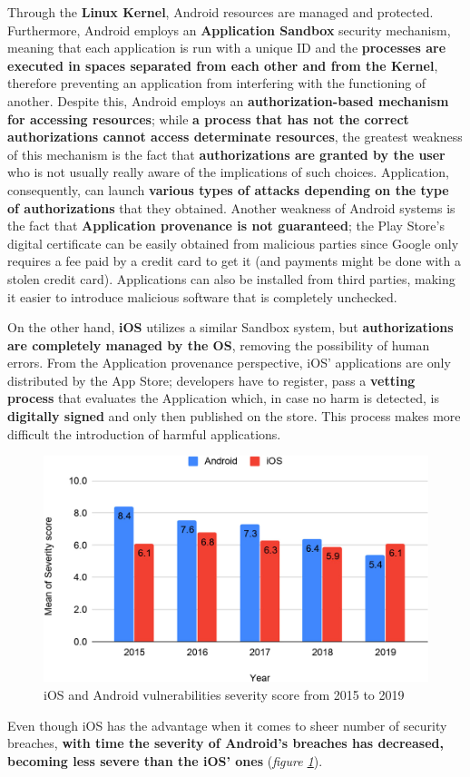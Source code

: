 Through the \textbf{Linux Kernel}, Android resources are managed and protected. Furthermore, Android employs an \textbf{Application Sandbox} security mechanism, meaning that each application is run with a unique ID and the \textbf{processes are executed in spaces separated from each other and from the Kernel}, therefore preventing an application from interfering with the functioning of another. Despite this, Android employs an \textbf{authorization-based mechanism for accessing resources}; while \textbf{a process that has not the correct authorizations cannot access determinate resources}, the greatest weakness of this mechanism is the fact that \textbf{authorizations are granted by the user} who is not usually really aware of the implications of such choices. Application, consequently, can launch \textbf{various types of attacks depending on the type of authorizations} that they obtained. Another weakness of Android systems is the fact that \textbf{Application provenance is not guaranteed}; the Play Store's digital certificate can be easily obtained from malicious parties since Google only requires a fee paid by a credit card to get it (and payments might be done with a stolen credit card). Applications can also be installed from third parties, making it easier to introduce malicious software that is completely unchecked.

On the other hand, \textbf{iOS} utilizes a similar Sandbox system, but \textbf{authorizations are completely managed by the OS}, removing the possibility of human errors. From the Application provenance perspective, iOS' applications are only distributed by the App Store; developers have to register, pass a \textbf{vetting process} that evaluates the Application which, in case no harm is detected, is \textbf{digitally signed} and only then published on the store. This process makes more difficult the introduction of harmful applications.
\begin{figure}[H]
    \centering
    \includegraphics[scale=1.2]{document/chapters/chapter_3/images/mobile_vulnerabilities_severity.jpg}
    \caption{iOS and Android vulnerabilities severity score from 2015 to 2019 \cite{mobile_security}}
    \label{fig:mobile_vulnerabilities_severity}
\end{figure}
Even though iOS has the advantage when it comes to sheer number of security breaches, \textbf{with time the severity of Android's breaches has decreased, becoming less severe than the iOS' ones} (\textit{figure \ref{fig:mobile_vulnerabilities_severity}}).


